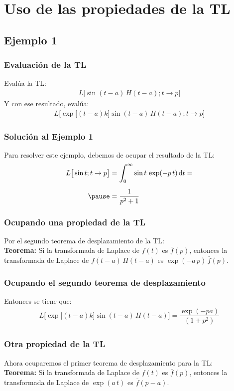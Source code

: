 \documentclass[12pt]{beamer}
\begin{document}
\section{Uso de las propiedades de la TL}
\subsection{Ejemplo 1}

\begin{frame}
\frametitle{Evaluación de la TL}
Evalúa la TL:
\pause
\begin{align*}
L \big[ \sin (t - a) \, H (t - a); t \to p  \big]
\end{align*}
\pause
Y con ese resultado, evalúa:
\pause
\begin{align*}
L \big[ \exp\big[ (t - a ) k \big] \sin (t - a) \, H (t - a); t \to p  \big]
\end{align*}
\end{frame}
\begin{frame}
\frametitle{Solución al Ejemplo 1}
Para resolver este ejemplo, debemos de ocupar el resultado de la TL:
\begin{eqnarray*}
\begin{aligned}
L \big[ \sin t ; t \to p  \big] &= \scaleint{6ex}_{\bs 0}^{\infty} \sin t \, \exp(-p \, t) \dd{t} = \\[0.5em] \pause
&= \dfrac{1}{p^{2} + 1}
\end{aligned}
\end{eqnarray*}
\end{frame}
\begin{frame}
\frametitle{Ocupando una propiedad de la TL}
Por el segundo teorema de desplazamiento de la TL:
\\
\bigskip
\pause
\noindent \textbf{Teorema: } Si la transformada de Laplace de $f(t)$ es $\overline{f}(p)$, entonces la transformada de Laplace de $f(t - a) \, H(t - a)$ es $\exp(-a \, p) \, \overline{f}(p)$.
\end{frame}
\begin{frame}
\frametitle{Ocupando el segundo teorema de desplazamiento}
Entonces se tiene que:
\begin{align*}
L \big[ \exp\big[ (t - a ) k \big] \sin (t - a) \, H (t - a) \big] = \dfrac{\exp (- p a)}{(1 + p^{2})}
\end{align*}
\end{frame}
\begin{frame}
\frametitle{Otra propiedad de la TL}
Ahora ocuparemos el primer teorema de desplazamiento para la TL:
\\
\bigskip
\pause
\noindent \textbf{Teorema: } Si la transformada de Laplace de $f(t)$ es $\overline{f}(p)$, entonces la transformada de Laplace de $\exp(a \, t)$ es $\overline{f}(p - a)$.
\end{frame}
\end{document}
